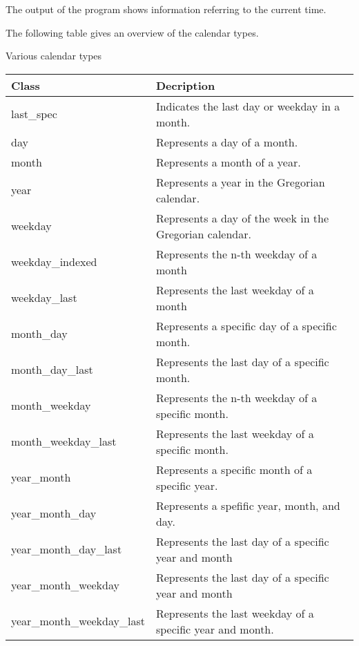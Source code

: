 The output of the program shows information referring to the current time.


The following table gives an overview of the calendar types.

\begin{center}
Various calendar types
\end{center}

\begin{longtable}[c]{|l|l|}
\hline
\textbf{Class}   & \textbf{Decription}                                     \\ \hline
\endfirsthead
%
\endhead
%
last\_spec       & Indicates the last day or weekday in a month.           \\ \hline
day              & Represents a day of a month.                            \\ \hline
month            & Represents a month of a year.                           \\ \hline
year             & Represents a year in the Gregorian calendar.            \\ \hline
weekday          & Represents a day of the week in the Gregorian calendar. \\ \hline
weekday\_indexed & Represents the n-th weekday of a month                  \\ \hline
weekday\_last    & Represents the last weekday of a month                  \\ \hline
month\_day       & Represents a specific day of a specific month.          \\ \hline
month\_day\_last & Represents the last day of a specific month.            \\ \hline
month\_weekday   & Represents the n-th weekday of a specific month.        \\ \hline
month\_weekday\_last       & Represents the last weekday of a specific month.          \\ \hline
year\_month      & Represents a specific month of a specific year.         \\ \hline
year\_month\_day & Represents a spefific year, month, and day.             \\ \hline
year\_month\_day\_last     & Represents the last day of a specific year and month      \\ \hline
year\_month\_weekday       & Represents the last day of a specific year and month      \\ \hline
year\_month\_weekday\_last & Represents the last weekday of a specific year and month. \\ \hline
\end{longtable}


